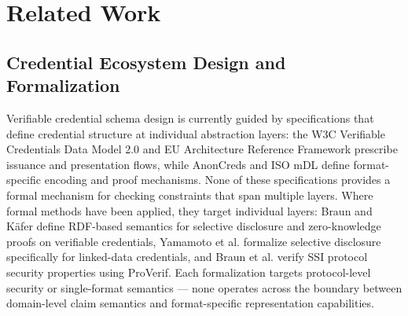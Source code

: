 


\section{Related Work}\label{related-work}

\label{sec:related-work}

\subsection{Credential Ecosystem Design and Formalization}\label{credential-ecosystem-design-and-formalization}

\label{sec:rw-credential}

Verifiable credential schema design is currently guided by specifications that define credential structure at individual abstraction layers: the W3C Verifiable Credentials Data Model 2.0 \citep{manu_verifiable_2025} and EU Architecture Reference Framework \citep{noauthor_eu-digital-identity-walleteudi-doc-architecture-and-reference-framework_2026} prescribe issuance and presentation flows, while AnonCreds \citep{curran2022anoncreds} and ISO mDL \citep{_mobile_2021} define format-specific encoding and proof mechanisms.  None of these specifications provides a formal mechanism for checking constraints that span multiple layers. Where formal methods have been applied, they target individual layers: Braun and Käfer \citep{curry_rdf-based_2025} define RDF-based semantics for selective disclosure and zero-knowledge proofs on verifiable credentials, Yamamoto et al. \citep{yamamoto_formalising_2022} formalize selective disclosure specifically for linked-data credentials, and Braun et al. \citep{braun_ssi_2024} verify SSI protocol security properties using ProVerif. Each formalization targets protocol-level security or single-format semantics --- none operates across the boundary between domain-level claim semantics and format-specific representation capabilities.

